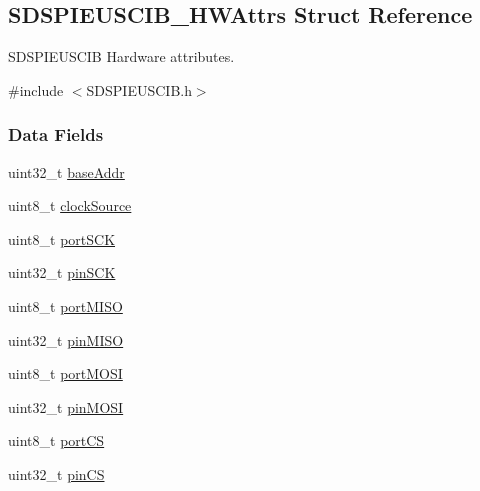 \subsection{S\-D\-S\-P\-I\-E\-U\-S\-C\-I\-B\-\_\-\-H\-W\-Attrs Struct Reference}
\label{struct_s_d_s_p_i_e_u_s_c_i_b___h_w_attrs}


S\-D\-S\-P\-I\-E\-U\-S\-C\-I\-B Hardware attributes.  




{\ttfamily \#include $<$S\-D\-S\-P\-I\-E\-U\-S\-C\-I\-B.\-h$>$}

\subsubsection*{Data Fields}
\begin{DoxyCompactItemize}
\item 
uint32\-\_\-t \hyperlink{struct_s_d_s_p_i_e_u_s_c_i_b___h_w_attrs_afd8979c081ca348a10f1894eb647cb55}{base\-Addr}
\item 
uint8\-\_\-t \hyperlink{struct_s_d_s_p_i_e_u_s_c_i_b___h_w_attrs_a9679db27cd498a286edd0fa472d9ecdd}{clock\-Source}
\item 
uint8\-\_\-t \hyperlink{struct_s_d_s_p_i_e_u_s_c_i_b___h_w_attrs_a06794ada31d2570b7ec9f6cf17b40eda}{port\-S\-C\-K}
\item 
uint32\-\_\-t \hyperlink{struct_s_d_s_p_i_e_u_s_c_i_b___h_w_attrs_acf04a6e03db4580245427e6b71e86b3d}{pin\-S\-C\-K}
\item 
uint8\-\_\-t \hyperlink{struct_s_d_s_p_i_e_u_s_c_i_b___h_w_attrs_a07a2ae46993c19e425d0ed690ceace8e}{port\-M\-I\-S\-O}
\item 
uint32\-\_\-t \hyperlink{struct_s_d_s_p_i_e_u_s_c_i_b___h_w_attrs_a03fb1a364c99bac2010c533553f6ffcc}{pin\-M\-I\-S\-O}
\item 
uint8\-\_\-t \hyperlink{struct_s_d_s_p_i_e_u_s_c_i_b___h_w_attrs_ab6f2f052acf4fbc2469b84dfd5a3a7fd}{port\-M\-O\-S\-I}
\item 
uint32\-\_\-t \hyperlink{struct_s_d_s_p_i_e_u_s_c_i_b___h_w_attrs_a76e4ea3cba4e266ff0699f85d7bd042a}{pin\-M\-O\-S\-I}
\item 
uint8\-\_\-t \hyperlink{struct_s_d_s_p_i_e_u_s_c_i_b___h_w_attrs_ac7a742be07f6c2d4cd75f3c1e0cb62db}{port\-C\-S}
\item 
uint32\-\_\-t \hyperlink{struct_s_d_s_p_i_e_u_s_c_i_b___h_w_attrs_acbca6e53d49d2367d170d54add9ababd}{pin\-C\-S}
\end{DoxyCompactItemize}


